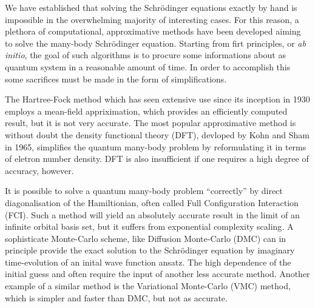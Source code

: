     We have established that solving the Schrödinger equations exactly by hand is 
    impossible in the overwhelming majority of interesting cases. For this reason, 
    a plethora of computational, approximative methods have been developed aiming 
    to solve the many-body Schrödinger equation. Starting from firt principles,
    or \emph{ab initio}, the goal of such algorithms is to procure some informations 
    about as quantum system in a reasonable amount of time. In order to accomplish 
    this some sacrifices must be made in the form of simplifications. 

    The Hartree-Fock
    method\cite{hartree1928wave,fock1930naherungsmethode,szabo2012modern} which 
    has seen extensive use since its inception in 1930
    employs a mean-field appriximation, which provides an efficiently computed result, 
    but it is not very accurate. The most popular approximative method is without doubt 
    the density functional theory (DFT), devloped by Kohn and Sham in
    1965\cite{kohn1965self}, simplifies the quantum many-body problem by reformulating 
    it in terms of eletron number density. DFT is also insufficient if one requires a 
    high degree of accuracy, however.

    It is possible to solve a quantum many-body problem  ``correctly'' by direct diagonalisation 
    of the Hamiltionian, often called Full Configuration Interaction (FCI). Such a method 
    will yield an absolutely accurate result in the limit of an infinite orbital basis set,
    but it suffers from exponential complexity scaling\cite{helgaker2014molecular}.
    A sophisticate Monte-Carlo scheme, like Diffusion Monte-Carlo (DMC) can in principle 
    provide the exact solution to the Schrödinger equation by imaginary time-evolution 
    of an inital wave function ansatz\cite{hammond1994monte}. The high dependence of the 
    initial guess and often require the input of another less accurate method. Another 
    example of a similar method is the Variational Monte-Carlo (VMC) method, which is
    simpler and faster than DMC, but not as accurate.

